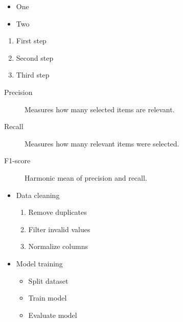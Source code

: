 \documentclass[../main.tex]{subfiles}
\begin{document}
\begin{itemize}
    \item One
    \item Two
\end{itemize}

\begin{enumerate}
    \item First step
    \item Second step
    \item Third step
\end{enumerate}

\begin{description}
    \item[Precision] Measures how many selected items are relevant.
    \item[Recall] Measures how many relevant items were selected.
    \item[F1-score] Harmonic mean of precision and recall.
\end{description}

\begin{itemize}
    \item Data cleaning
    \begin{enumerate}
        \item Remove duplicates
        \item Filter invalid values
        \item Normalize columns
    \end{enumerate}

    \item Model training
    \begin{itemize}
        \item Split dataset
        \item Train model
        \item Evaluate model
    \end{itemize}
\end{itemize}
\end{document}
